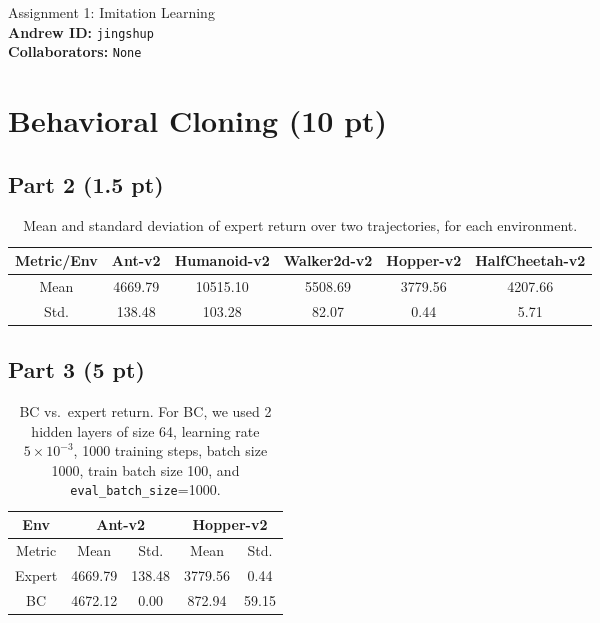 \documentclass{article}
\begin{document}
\begin{center}
    {\Large Assignment 1: Imitation Learning} \\
    \vspace{.25cm}
    \textbf{Andrew ID:} \texttt{jingshup} \\
    \textbf{Collaborators:} \texttt{None}
\end{center}


\section{Behavioral Cloning (10 pt)}

\subsection{Part 2 (1.5 pt)}
\begin{table}[!h]
  \centering
  \caption{Mean and standard deviation of expert return over two trajectories, for each environment.}
  \begin{tabular}{cccccc}
    \toprule
    Metric/Env & Ant-v2 & Humanoid-v2 & Walker2d-v2 & Hopper-v2 & HalfCheetah-v2 \\
    \midrule
    Mean  & 4669.79 & 10515.10 & 5508.69 & 3779.56 & 4207.66 \\
    Std.  & 138.48 & 103.28 & 82.07 & 0.44 & 5.71 \\
    \bottomrule
  \end{tabular}
  \label{tab:p2}
\end{table}

\subsection{Part 3 (5 pt)}
\begin{table}[htbp]
  \centering
  \caption{BC vs.\ expert return. For BC, we used 2 hidden layers of size 64, learning rate $5\times 10^{-3}$, 1000 training steps, batch size 1000, train batch size 100, and \texttt{eval\_batch\_size}=1000.}
  \begin{tabular}{ccccc}
    \toprule
    Env   & \multicolumn{2}{c}{Ant-v2} & \multicolumn{2}{c}{Hopper-v2} \\
    \midrule
    Metric & Mean  & Std.  & Mean  & Std. \\
    Expert & 4669.79 & 138.48 & 3779.56 & 0.44 \\
    BC    & 4672.12 & 0.00 & 872.94 & 59.15 \\
    \bottomrule
  \end{tabular}
  \label{tab:p3}
\end{table}
\end{document}
